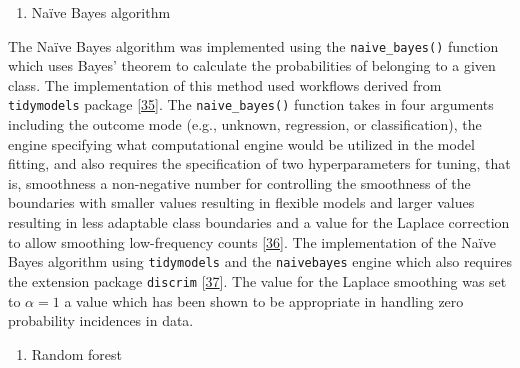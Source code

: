 \documentclass[
  10pt,
]{article}
\providecommand{\tightlist}{%
  \setlength{\itemsep}{0pt}\setlength{\parskip}{0pt}}
\begin{document}
\begin{enumerate}
\def\labelenumi{(\arabic{enumi})}
\tightlist
\item
  Naïve Bayes algorithm
\end{enumerate}

The Naïve Bayes algorithm was implemented using the \texttt{naive\_bayes()} function which uses Bayes' theorem to calculate the probabilities of belonging to a given class. The implementation of this method used workflows derived from \texttt{tidymodels} package {[}\protect\hyperlink{ref-kuhn2020}{35}{]}. The \texttt{naive\_bayes()} function takes in four arguments including the outcome mode (e.g., unknown, regression, or classification), the engine specifying what computational engine would be utilized in the model fitting, and also requires the specification of two hyperparameters for tuning, that is, smoothness a non-negative number for controlling the smoothness of the boundaries with smaller values resulting in flexible models and larger values resulting in less adaptable class boundaries and a value for the Laplace correction to allow smoothing low-frequency counts {[}\protect\hyperlink{ref-Kuhn2013}{36}{]}. The implementation of the Naïve Bayes algorithm using \texttt{tidymodels} and the \texttt{naivebayes} engine which also requires the extension package \texttt{discrim} {[}\protect\hyperlink{ref-emil2022}{37}{]}. The value for the Laplace smoothing was set to \(\alpha = 1\) a value which has been shown to be appropriate in handling zero probability incidences in data.

\begin{enumerate}
\def\labelenumi{(\arabic{enumi})}
\setcounter{enumi}{1}
\tightlist
\item
  Random forest
\end{enumerate}
\end{document}
